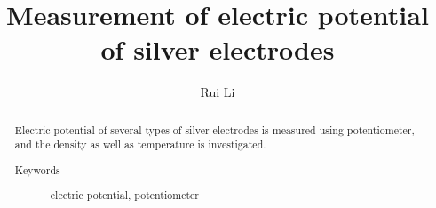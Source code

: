 \documentclass[%
 reprint,
 amsmath,amssymb,
 aps,
10.5pt,
]{revtex4-1}
\begin{document}

\title{Measurement of electric potential of silver electrodes}%

\author{Rui Li}
%





\begin{abstract}
Electric potential of several types of silver electrodes is measured using potentiometer, and the density as well as temperature is investigated.
\begin{description}
\item[Keywords]
electric potential, potentiometer
\end{description}
\end{abstract}

\maketitle

\tableofcontents
\end{document}
